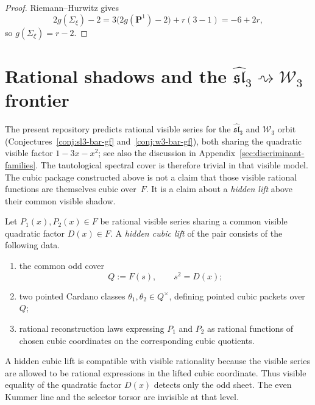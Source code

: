 \begin{proof}
Riemann--Hurwitz gives
\[
2g(\Sigma_{\xi})-2
=3\bigl(2g(\mathbf P^1)-2\bigr)+r(3-1)
=-6+2r,
\]
so $g(\Sigma_{\xi})=r-2$.
\end{proof}

\section{Rational shadows and the \texorpdfstring{$\widehat{\mathfrak{sl}}_3\rightsquigarrow\mathcal W_3$}{sl3 -> W3} frontier}
\label{sec:rational-shadows-sl3-w3}

The present repository predicts rational visible series for the
$\widehat{\mathfrak{sl}}_3$ and $\mathcal W_3$ orbit
(Conjectures~\ref{conj:sl3-bar-gf} and~\ref{conj:w3-bar-gf}), both sharing the
quadratic visible factor $1-3x-x^2$; see also the discussion in
Appendix~\ref{sec:discriminant-families}.  The tautological spectral cover is
therefore trivial in that visible model.  The cubic package constructed above is
not a claim that those visible rational functions are themselves cubic over~$F$.
It is a claim about a \emph{hidden lift} above their common visible shadow.

\begin{definition}
\label{def:hidden-cubic-lift-rational-pair}
Let $P_1(x),P_2(x)\in F$ be rational visible series sharing a common visible
quadratic factor $D(x)\in F$.  A \emph{hidden cubic lift} of the pair consists
of the following data.
\begin{enumerate}[label=\textup{(\roman*)}]
\item the common odd cover
\[
Q:=F(s),\qquad s^2=D(x);
\]
\item two pointed Cardano classes
$\theta_1,\theta_2\in Q^{\times}$, defining pointed cubic packets over~$Q$;
\item rational reconstruction laws expressing $P_1$ and $P_2$ as rational
functions of chosen cubic coordinates on the corresponding cubic quotients.
\end{enumerate}
\end{definition}

\begin{remark}
\label{rem:visible-vs-lifted-invariance-sl3}
A hidden cubic lift is compatible with visible rationality because the visible
series are allowed to be rational expressions in the lifted cubic coordinate.
Thus visible equality of the quadratic factor $D(x)$ detects only the odd sheet.
The even Kummer line and the selector torsor are invisible at that level.
\end{remark}


